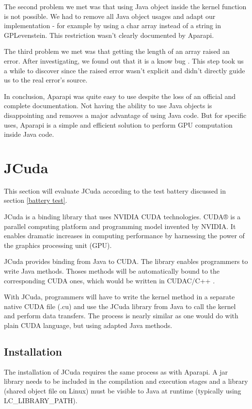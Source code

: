 The second problem we met was that using Java object inside the kernel function is not possible. We had to remove all Java object usages and adapt our implementation - for example by using a char array instead of a string in GPLevenstein. This restriction wasn't clearly documented by Aparapi.

The third problem we met was that getting the length of an array raised an error. After investigating, we found out that it is a know bug \cite{aparapibug}. This step took us a while to discover since the raised error wasn't explicit and didn't directly guide us to the real error's source.

In conclusion, Aparapi was quite easy to use despite the loss of an official and complete documentation. Not having the ability to use Java objects is disappointing and removes a major advantage of using Java code. But for specific uses, Aparapi is a simple and efficient solution to perform GPU computation inside Java code. 

\section{JCuda}

This section will evaluate JCuda according to the test battery discussed in section \ref{battery test}.

JCuda is a binding library that uses NVIDIA CUDA technologies. CUDA® is a parallel computing platform and programming model invented by NVIDIA. It enables dramatic increases in computing performance by harnessing the power of the graphics processing unit (GPU)\cite{cudahome}.

JCuda provides binding from Java to CUDA. The library enables programmers to write Java methods. Thoses methods will be automatically bound to the corresponding CUDA ones, which would be written in CUDAC/C++ \cite{cudagpgpu}.

With JCuda, programmers will have to write the kernel method in a separate native CUDA file (.cu) and use the JCuda library from Java to call the kernel and perform data transfers. The process is nearly similar as one would do with plain CUDA language, but using adapted Java methods.

\subsection{Installation}

The installation of JCuda requires the same process as with Aparapi. A jar library needs to be included in the compilation and execution stages and a library (shared object file on Linux) must be visible to Java at runtime (typically using LC\_LIBRARY\_PATH).

